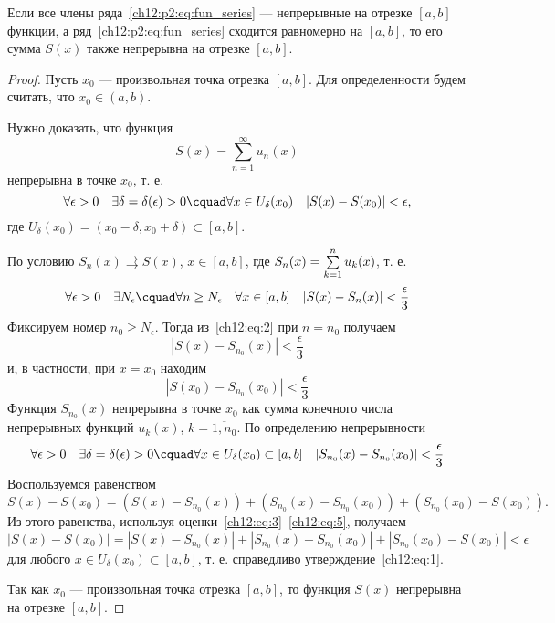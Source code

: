 \begin{thm}
	\label{ch12:th:continuity}
	Если все члены ряда~\eqref{ch12:p2:eq:fun_series} --- непрерывные на отрезке $[a, b]$ функции,
	а ряд~\eqref{ch12:p2:eq:fun_series} сходится равномерно на $[a, b]$, то его сумма $S(x)$
	также непрерывна на отрезке $[a, b]$.
\end{thm}
\begin{proof}
	Пусть $x_0$ --- произвольная точка отрезка $[a, b]$. Для определенности будем считать,
	что $x_0 \in (a, b)$.

	Нужно доказать, что функция
	$$
		S(x) = \sum_{n=1}^{\infty} u_n(x)
	$$
	непрерывна в точке $x_0$, т. е.
	\begin{equation}
		\label{ch12:eq:1}
		\forall \epsilon > 0 \quad \exists \delta = \delta(\epsilon) > 0 \cquad
			\forall x \in U_{\delta}(x_0) \quad |S(x) - S(x_0)| < \epsilon,
	\end{equation}
	где $U_{\delta}(x_0) = (x_0 - \delta, x_0 + \delta) \subset [a, b]$.

	По условию $S_n(x) \rightrightarrows S(x)$, $x \in [a, b]$,
	где $S_n(x) = \sum_{k=1}^{n}\limits u_k(x)$, т. е.
	\begin{equation}
		\label{ch12:eq:2}
		\forall \epsilon > 0 \quad \exists N_{\epsilon} \cquad \forall n \ge N_{\epsilon} \quad
			\forall x \in [a, b] \quad |S(x) - S_n(x)| < \frac{\epsilon}{3}
	\end{equation}
	Фиксируем номер $n_0 \ge N_{\epsilon}$. Тогда из~\eqref{ch12:eq:2} при $n = n_0$ получаем
	\begin{equation}
		\label{ch12:eq:3}
		|S(x) - S_{n_0}(x)| < \frac{\epsilon}{3}
	\end{equation}
	и, в частности, при $x = x_0$ находим
	\begin{equation}
		\label{ch12:eq:4}
		|S(x_0) - S_{n_0}(x_0)| < \frac{\epsilon}{3}
	\end{equation}
	Функция $S_{n_0}(x)$ непрерывна в точке $x_0$ как сумма конечного числа непрерывных функций
	$u_k(x)$, $k = \overline{1, n_0}$. По определению непрерывности
	\begin{equation}
		\label{ch12:eq:5}
		\forall \epsilon > 0 \quad \exists \delta = \delta(\epsilon) > 0 \cquad
			\forall x \in U_\delta(x_0) \subset [a, b] \quad |S_{n_0}(x) - S_{n_0}(x_0)| < \frac{\epsilon}{3}
	\end{equation}
	Воспользуемся равенством
	$$
		S(x) - S(x_0) = (S(x) - S_{n_0}(x)) + (S_{n_0}(x) - S_{n_0}(x_0)) + (S_{n_0}(x_0) - S(x_0)).
	$$
	Из этого равенства, используя оценки~\eqref{ch12:eq:3}--\eqref{ch12:eq:5}, получаем
	$$
		|S(x) - S(x_0)| = |S(x) - S_{n_0}(x)| + |S_{n_0}(x) - S_{n_0}(x_0)| + |S_{n_0}(x_0) - S(x_0)| < \epsilon
	$$
	для любого $x \in U_\delta(x_0) \subset [a, b]$, т. е. справедливо утверждение~\eqref{ch12:eq:1}.

	Так как $x_0$ --- произвольная точка отрезка $[a, b]$, то функция $S(x)$ непрерывна на отрезке $[a, b]$.
\end{proof}

